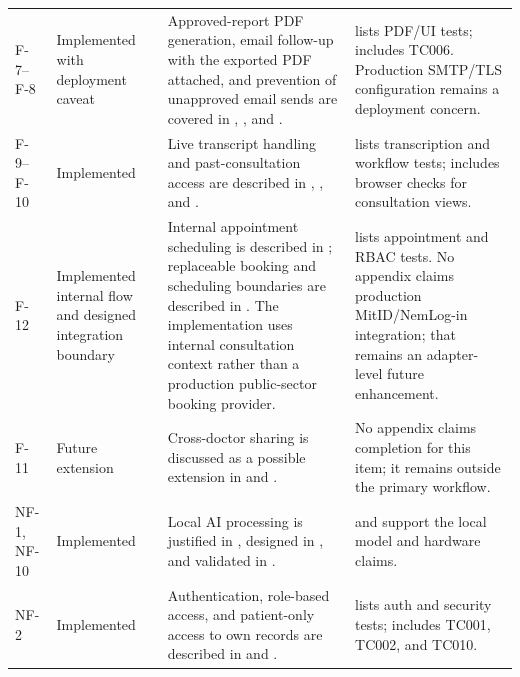 \begin{longtable}{@{}P{0.13\textwidth}P{0.13\textwidth}P{0.34\textwidth}P{0.28\textwidth}@{}}
F-7--F-8 & Implemented with deployment caveat & Approved-report PDF generation, email follow-up with the exported PDF attached, and prevention of unapproved email sends are covered in , , and . &  lists PDF/UI tests;  includes TC006. Production SMTP/TLS configuration remains a deployment concern. \\
F-9--F-10 & Implemented & Live transcript handling and past-consultation access are described in , , and . &  lists transcription and workflow tests;  includes browser checks for consultation views. \\
F-12 & Implemented internal flow and designed integration boundary & Internal appointment scheduling is described in ; replaceable booking and scheduling boundaries are described in . The implementation uses internal consultation context rather than a production public-sector booking provider. &  lists appointment and RBAC tests. No appendix claims production MitID/NemLog-in integration; that remains an adapter-level future enhancement. \\
F-11 & Future extension & Cross-doctor sharing is discussed as a possible extension in  and . & No appendix claims completion for this item; it remains outside the primary workflow. \\
NF-1, NF-10 & Implemented & Local AI processing is justified in , designed in , and validated in . &  and  support the local model and hardware claims. \\
NF-2 & Implemented & Authentication, role-based access, and patient-only access to own records are described in  and . &  lists auth and security tests;  includes TC001, TC002, and TC010. \\

\end{longtable}
